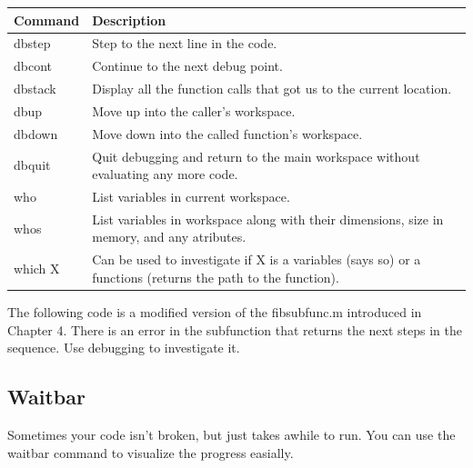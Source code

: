 \begin{center}
    \begin{tabular}{ | l | p{7cm} |}
    \hline Command & Description \\ \hline
    dbstep & Step to the next line in the code. \\ \hline
    dbcont & Continue to the next debug point. \\ \hline
    dbstack & Display all the function calls that got us to the current location. \\ \hline
    dbup & Move up into the caller's workspace. \\ \hline
    dbdown & Move down into the called function's workspace. \\ \hline
    dbquit & Quit debugging and return to the main workspace without evaluating any more code. \\ \hline
    who & List variables in current workspace. \\ \hline
    whos & List variables in workspace along with their dimensions, size in memory, and any atributes. \\ \hline
    which X & Can be used to investigate if X is a variables (says so) or a functions (returns the path to the function). \\ \hline
    \end{tabular}
\end{center}

The following code is a modified version of the fibsubfunc.m introduced in Chapter 4.
 There is an error in the subfunction that returns the next steps in the sequence.
 Use debugging to investigate it.

\begin{quote}
 
\end{quote}

\pagebreak
\subsection{Waitbar}
Sometimes your code isn't broken, but just takes awhile to run.
 You can use the waitbar command to visualize the progress easially.

\begin{quote}
 
\end{quote}
